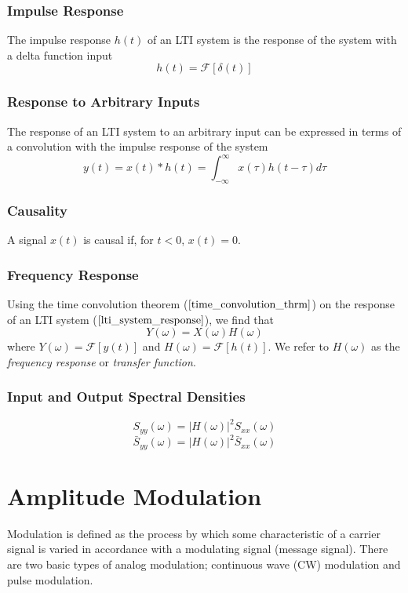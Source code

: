 \documentclass[]{article}
\begin{document}
\subsubsection{Impulse Response}
The impulse response $h(t)$ of an LTI system is the response of the system with a delta function input
\begin{equation} h(t) = \mathcal{F}[\delta(t)] \label{impulse_response_def}\end{equation}
\subsubsection{Response to Arbitrary Inputs}
The response of an LTI system to an arbitrary input can be expressed in terms of a convolution with the impulse response of the system
\begin{equation}y(t) = x(t)*h(t)=\int_{-\infty}^{\infty}x(\tau)h(t-\tau)d\tau\label{lti_system_response} \end{equation}
\subsubsection{Causality}
A signal $x(t)$ is causal if, for $t<0$, $x(t)=0$.
\subsubsection{Frequency Response}
Using the time convolution theorem ($\ref{time_convolution_thrm}$) on the response of an LTI system ($\ref{lti_system_response}$), we find that
\begin{equation} Y(\omega) = X(\omega)H(\omega) \label{freq_response} \end{equation}
where $Y(\omega)=\mathscr{F}[y(t)]$ and $H(\omega)=\mathscr{F}[h(t)]$. We refer to $H(\omega)$ as the \textit{frequency response} or \textit{transfer function}.
\subsubsection{Input and Output Spectral Densities}
\begin{equation} S_{yy}(\omega) = |H(\omega)|^{2} S_{xx}(\omega)  \end{equation}
\begin{equation}\bar{S}_{yy}(\omega) = |H(\omega)|^{2} \bar{S}_{xx}(\omega)  \end{equation}

\newpage
\section{Amplitude Modulation}
Modulation is defined as the process by which some characteristic of a carrier signal is varied in accordance with a modulating signal (message signal). There are two basic types of analog modulation; continuous wave (CW) modulation and pulse modulation.
\end{document}
